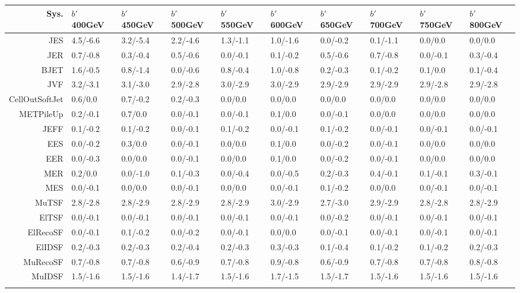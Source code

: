 \begin{tabular}{r|p{.08\linewidth}p{.08\linewidth}p{.08\linewidth}p{.08\linewidth}p{.08\linewidth}p{.08\linewidth}p{.08\linewidth}p{.08\linewidth}p{.08\linewidth}}
\toprule
 Sys.  & $b'$ 400GeV & $b'$ 450GeV & $b'$ 500GeV & $b'$ 550GeV & $b'$ 600GeV & $b'$ 650GeV & $b'$ 700GeV & $b'$ 750GeV & $b'$ 800GeV \\
\toprule
JES  & 4.5/-6.6 & 3.2/-5.4 & 2.2/-4.6 & 1.3/-1.1 & 1.0/-1.6 & 0.0/-0.2 & 0.1/-1.1 & 0.0/0.0 & 0.0/0.0 \\
JER  & 0.7/-0.8 & 0.3/-0.4 & 0.5/-0.6 & 0.0/-0.1 & 0.1/-0.2 & 0.5/-0.6 & 0.7/-0.8 & 0.0/-0.1 & 0.3/-0.4 \\
BJET  & 1.6/-0.5 & 0.8/-1.4 & 0.0/-0.6 & 0.8/-0.4 & 1.0/-0.8 & 0.2/-0.3 & 0.1/-0.2 & 0.1/0.0 & 0.1/-0.4 \\
JVF  & 3.2/-3.1 & 3.1/-3.0 & 2.9/-2.8 & 3.0/-2.9 & 3.0/-2.9 & 2.9/-2.9 & 2.9/-2.9 & 2.9/-2.8 & 2.9/-2.8 \\
CellOutSoftJet  & 0.6/0.0 & 0.7/-0.2 & 0.2/-0.3 & 0.0/0.0 & 0.0/0.0 & 0.0/0.0 & 0.0/0.0 & 0.0/0.0 & 0.0/0.0 \\
METPileUp  & 0.2/-0.1 & 0.7/0.0 & 0.0/-0.1 & 0.0/-0.1 & 0.1/0.0 & 0.0/-0.1 & 0.0/0.0 & 0.0/0.0 & 0.0/0.0 \\
JEFF  & 0.1/-0.2 & 0.1/-0.2 & 0.0/-0.1 & 0.1/-0.2 & 0.0/-0.1 & 0.1/-0.2 & 0.0/-0.1 & 0.0/-0.1 & 0.0/-0.1 \\
EES  & 0.0/-0.2 & 0.3/0.0 & 0.0/-0.1 & 0.0/0.0 & 0.1/0.0 & 0.0/-0.2 & 0.0/-0.1 & 0.0/0.0 & 0.0/0.0 \\
EER  & 0.0/-0.3 & 0.0/0.0 & 0.0/-0.1 & 0.0/0.0 & 0.1/0.0 & 0.0/-0.2 & 0.0/-0.1 & 0.0/0.0 & 0.0/0.0 \\
MER  & 0.2/0.0 & 0.0/-1.0 & 0.1/-0.3 & 0.0/-0.4 & 0.0/-0.5 & 0.2/-0.3 & 0.4/-0.1 & 0.1/-0.1 & 0.3/-0.1 \\
MES  & 0.0/-0.1 & 0.0/0.0 & 0.0/-0.1 & 0.0/0.0 & 0.0/-0.1 & 0.1/-0.2 & 0.0/0.0 & 0.0/-0.1 & 0.0/-0.1 \\
MuTSF  & 2.8/-2.8 & 2.8/-2.9 & 2.8/-2.9 & 2.8/-2.9 & 3.0/-2.9 & 2.7/-3.0 & 2.9/-2.9 & 2.8/-2.8 & 2.8/-2.9 \\
ElTSF  & 0.0/-0.1 & 0.0/-0.1 & 0.0/-0.1 & 0.0/-0.1 & 0.0/-0.1 & 0.0/-0.2 & 0.0/-0.1 & 0.0/-0.1 & 0.0/-0.1 \\
ElRecoSF  & 0.0/-0.1 & 0.1/-0.2 & 0.0/-0.2 & 0.0/-0.1 & 0.0/0.0 & 0.0/-0.1 & 0.0/-0.1 & 0.0/-0.1 & 0.0/-0.1 \\
ElIDSF  & 0.2/-0.3 & 0.2/-0.3 & 0.2/-0.4 & 0.2/-0.3 & 0.3/-0.3 & 0.1/-0.4 & 0.1/-0.2 & 0.1/-0.2 & 0.2/-0.3 \\
MuRecoSF  & 0.7/-0.8 & 0.7/-0.8 & 0.6/-0.9 & 0.7/-0.8 & 0.9/-0.8 & 0.6/-0.9 & 0.7/-0.8 & 0.7/-0.8 & 0.8/-0.8 \\
MuIDSF  & 1.5/-1.6 & 1.5/-1.6 & 1.4/-1.7 & 1.5/-1.6 & 1.7/-1.5 & 1.5/-1.7 & 1.5/-1.6 & 1.5/-1.6 & 1.5/-1.6 \\
 \\
\bottomrule
\end{tabular}
